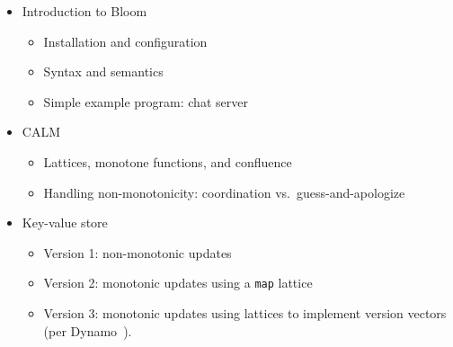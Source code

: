 \documentclass{sig-alternate}
\begin{document}
\begin{itemize}
\item
  Introduction to Bloom
  \begin{itemize}
  \item
    Installation and configuration
  \item
    Syntax and semantics
  \item
    Simple example program: chat server
  \end{itemize}
\item
  CALM
  \begin{itemize}
  \item
    Lattices, monotone functions, and confluence
  \item
    Handling non-monotonicity: coordination vs.\ guess-and-apologize
  \end{itemize}
\item
  Key-value store
  \begin{itemize}
  \item
    Version 1: non-monotonic updates
  \item
    Version 2: monotonic updates using a \texttt{map} lattice
  \item
    Version 3: monotonic updates using lattices to implement version vectors
    (per Dynamo~\cite{DeCandia2007}).
  \end{itemize}
\end{itemize}



\end{document}
